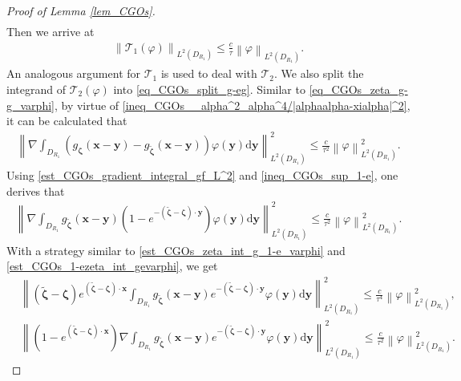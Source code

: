 \documentclass[11pt,reqno,oneside]{amsart}
\theoremstyle{definition}
\theoremstyle{remark}
\numberwithin{equation}{section}
\numberwithin{equation}{section}
\theoremstyle{remark}
\begin{document}
\begin{proof}[Proof of Lemma \ref{lem_CGOs}]
\begin{align}
	\end{align}
	Then we arrive at  
	\begin{align} \label{est_CGOs_T1}
		\left\| \mathcal{T}_1\left(\varphi\right) \right\|_{L^2\left(D_{R_1}\right)} \leqslant \frac{c}{\tau} \left\| \varphi \right\|_{L^2\left(D_{R_1}\right)}.
	\end{align}	
	An analogous argument for $ \mathcal{T}_1 $ is used to deal with $ \mathcal{T}_2 $. We also split the integrand of $ \mathcal{T}_2\left(\varphi\right) $ into \eqref{eq_CGOs_split_g-eg}. Similar to \eqref{eq_CGOs_zeta_g-g_varphi}, by virtue of \eqref{ineq_CGOs__alpha^2_alpha^4/|alphaalpha-xialpha|^2}, it can be calculated that
	\begin{align} \label{est_CGOs_nabla_int_g-g}
		\left\| \nabla \int_{D_{R_1}} \left(g_{\bm{\zeta}}\left(\mathbf{x} - \mathbf{y}\right) - g_{\tilde{\bm{\zeta}}}\left(\mathbf{x} - \mathbf{y}\right)\right) \varphi \left(\mathbf{y}\right) \mathrm{d} \mathbf{y} \right\|^2_{L^2\left(D_{R_1}\right)} \leqslant \frac{c}{\tau^2} \left\| \varphi \right\|^2_{L^2\left(D_{R_1}\right)} .
	\end{align}
	Using \eqref{est_CGOs_gradient_integral_gf_L^2} and \eqref{ineq_CGOs_sup_1-e}, one derives that 
	\begin{align} \label{est_CGOs_nabla_int_g1-e}
		\left\| \nabla \int_{D_{R_1}} g_{\tilde{\bm{\zeta}}}\left(\mathbf{x} - \mathbf{y}\right) \left(1 - e^{-\left(\tilde{\bm{\zeta}}-\bm{\zeta}\right) \cdot \mathbf{y}} \right) \varphi \left(\mathbf{y}\right) \mathrm{d} \mathbf{y} \right\|^2_{L^2\left(D_{R_1}\right)} \leqslant \frac{c}{\tau^2} \left\| \varphi \right\|^2_{L^2\left(D_{R_1}\right)} .
	\end{align}
	With a strategy similar to \eqref{est_CGOs_zeta_int_g_1-e_varphi} and \eqref{est_CGOs_1-ezeta_int_gevarphi}, we get
	\begin{align}
		\label{est_CGOs_zeta-zetae_int_ge}
		& \left\| (\tilde{\bm{\zeta}}-\bm{\zeta})  e^{\left(\tilde{\bm{\zeta}}-\bm{\zeta}\right) \cdot \mathbf{x}} \int_{D_{R_1}} g_{\tilde{\bm{\zeta}}}\left(\mathbf{x} - \mathbf{y}\right) e^{-\left(\tilde{\bm{\zeta}}-\bm{\zeta}\right) \cdot \mathbf{y}} \varphi \left(\mathbf{y}\right) \mathrm{d} \mathbf{y} \right\|^2_{L^2\left(D_{R_1}\right)} \leqslant \frac{c}{\tau^4} \left\| \varphi \right\|^2_{L^2\left(D_{R_1}\right)}, \\
		\label{est_CGOs_1-e_nabla_int_ge}
		& \left\| \left(1 - e^{\left(\tilde{\bm{\zeta}}-\bm{\zeta}\right) \cdot \mathbf{x}} \right) \nabla \int_{D_{R_1}} g_{\tilde{\bm{\zeta}}}\left(\mathbf{x} - \mathbf{y}\right) e^{-\left(\tilde{\bm{\zeta}}-\bm{\zeta}\right) \cdot \mathbf{y}} \varphi \left(\mathbf{y}\right) \mathrm{d} \mathbf{y} \right\|^2_{L^2\left(D_{R_1}\right)} \leqslant \frac{c}{\tau^2} \left\| \varphi \right\|^2_{L^2\left(D_{R_1}\right)}.

\end{align}
\end{proof}
\end{document}

